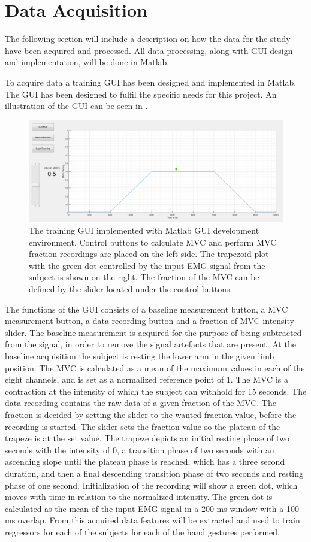 \section{Data Acquisition}

The following section will include a description on how the data for the study have been acquired and processed. All data processing, along with GUI design and implementation, will be done in Matlab.

To acquire data a training GUI has been designed and implemented in Matlab. The GUI has been designed to fulfil the specific needs for this project. An illustration of the GUI can be seen in . 

\begin{figure}[H]
	\includegraphics[width=.4\textwidth]{figures/GUI/GUI_Training.png}
	\caption{The training GUI implemented with Matlab GUI development environment. Control buttons to calculate MVC and perform MVC fraction recordings are placed on the left side. The trapezoid plot with the green dot controlled by the input EMG signal from the subject is shown on the right. The fraction of the MVC can be defined by the slider located under the control buttons.}
	\label{fig:GUI_Training}
\end{figure} 

The functions of the GUI consists of a baseline measurement button, a MVC measurement button, a data recording button and a fraction of MVC intensity slider. The baseline measurement is acquired for the purpose of being subtracted from the signal, in order to remove the signal artefacts that are present. At the baseline acquisition the subject is resting the lower arm in the given limb position. The MVC is calculated as a mean of the maximum values in each of the eight channels, and is set as a normalized reference point of 1. The MVC is a contraction at the intensity of which the subject can withhold for 15 seconds. The data recording contains the raw data of a given fraction of the MVC. The fraction is decided by setting the slider to the wanted fraction value, before the recording is started. The slider sets the fraction value so the plateau of the trapeze is at the set value. The trapeze depicts an initial resting phase of two seconds with the intensity of 0, a transition phase of two seconds with an ascending slope until the plateau phase is reached, which has a three second duration, and then a final descending transition phase of two seconds and resting phase of one second. Initialization of the recording will show a green dot, which moves with time in relation to the normalized intensity. The green dot is calculated as the mean of the input EMG signal in a 200 ms window with a 100 ms overlap. %
From this acquired data features will be extracted and used to train regressors for each of the subjects for each of the hand gestures performed.


